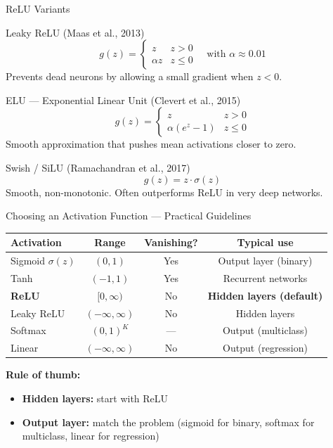 \documentclass[aspectratio=169]{beamer}
\begin{document}
%
%
\begin{frame}{ReLU Variants}
\footnotesize
\begin{block}{Leaky ReLU (Maas et al., 2013)}
\[
g(z) = \begin{cases} z & z > 0 \\ \alpha z & z \leq 0 \end{cases}
\quad \text{with } \alpha \approx 0.01
\]
Prevents dead neurons by allowing a small gradient when $z < 0$.
\end{block}

\begin{block}{ELU --- Exponential Linear Unit (Clevert et al., 2015)}
\[
g(z) = \begin{cases} z & z > 0 \\ \alpha(e^z - 1) & z \leq 0 \end{cases}
\]
Smooth approximation that pushes mean activations closer to zero.
\end{block}

\begin{block}{Swish / SiLU (Ramachandran et al., 2017)}
\[
g(z) = z \cdot \sigma(z)
\]
Smooth, non-monotonic. Often outperforms ReLU in very deep networks.
\end{block}
\end{frame}
%
%
\begin{frame}{Choosing an Activation Function --- Practical Guidelines}

\begin{center}
\renewcommand{\arraystretch}{1.4}
\begin{tabular}{l c c c}
\hline
\textbf{Activation} & \textbf{Range} & \textbf{Vanishing?} & \textbf{Typical use} \\
\hline
Sigmoid $\sigma(z)$ & $(0,1)$ & Yes & Output layer (binary) \\
Tanh & $(-1,1)$ & Yes & Recurrent networks \\
\textbf{ReLU} & $[0,\infty)$ & No & \textbf{Hidden layers (default)} \\
Leaky ReLU & $(-\infty,\infty)$ & No & Hidden layers \\
Softmax & $(0,1)^K$ & --- & Output (multiclass) \\
Linear & $(-\infty,\infty)$ & No & Output (regression) \\
\hline
\end{tabular}
\end{center}

\vspace{0.3cm}
\footnotesize
\textbf{Rule of thumb:}
\begin{itemize}
    \item \textbf{Hidden layers:} start with ReLU
    \item \textbf{Output layer:} match the problem (sigmoid for binary, softmax for multiclass, linear for regression)
\end{itemize}
\end{frame}
%
\end{document}
